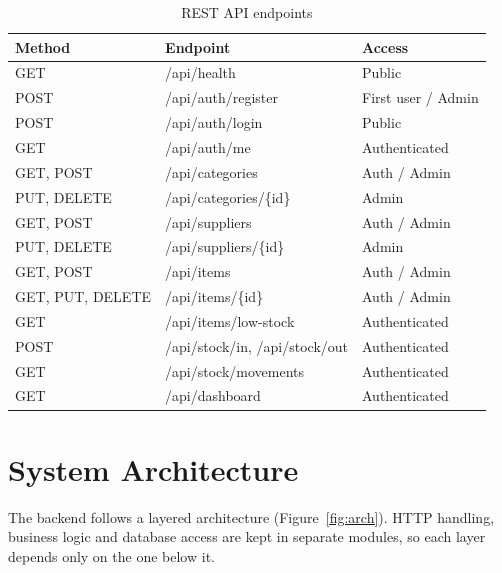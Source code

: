 \documentclass[12pt,a4paper,oneside]{book}
\begin{document}
\begin{table}[H]
\centering
\caption{REST API endpoints}
\label{tab:api}
\small
\begin{tabular}{@{}>{\ttfamily}l >{\ttfamily}l l@{}}
\toprule
\textrm{\textbf{Method}} & \textrm{\textbf{Endpoint}} & \textbf{Access} \\
\midrule
GET  & /api/health                 & Public \\
POST & /api/auth/register          & First user / Admin \\
POST & /api/auth/login             & Public \\
GET  & /api/auth/me                & Authenticated \\
GET, POST & /api/categories        & Auth / Admin \\
PUT, DELETE & /api/categories/\{id\} & Admin \\
GET, POST & /api/suppliers         & Auth / Admin \\
PUT, DELETE & /api/suppliers/\{id\}  & Admin \\
GET, POST & /api/items             & Auth / Admin \\
GET, PUT, DELETE & /api/items/\{id\} & Auth / Admin \\
GET  & /api/items/low-stock        & Authenticated \\
POST & /api/stock/in, /api/stock/out & Authenticated \\
GET  & /api/stock/movements        & Authenticated \\
GET  & /api/dashboard              & Authenticated \\
\bottomrule
\end{tabular}
\end{table}

\section{System Architecture}
The backend follows a layered architecture (Figure~\ref{fig:arch}). HTTP handling, business
logic and database access are kept in separate modules, so each layer depends only on the
one below it.
\end{document}
